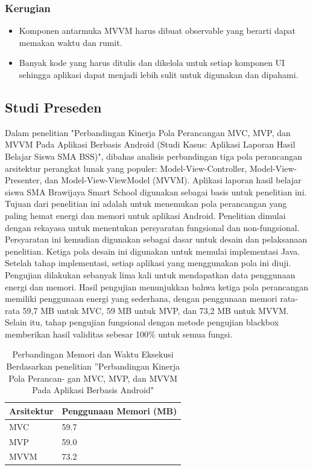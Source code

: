 \documentclass[conference]{IEEEtran}
\begin{document}
	\subsubsection{Kerugian}
	\begin{itemize}
		\item Komponen antarmuka MVVM harus dibuat observable yang berarti dapat memakan waktu dan rumit.
		\item Banyak kode yang harus ditulis dan dikelola untuk setiap komponen UI sehingga aplikasi dapat menjadi lebih sulit untuk digunakan dan dipahami.
	\end{itemize}
	
	\subsection{Studi Preseden}
	Dalam penelitian "Perbandingan Kinerja Pola Perancangan MVC, MVP, dan MVVM Pada Aplikasi Berbasis Android (Studi Kasus: Aplikasi Laporan Hasil Belajar Siswa SMA BSS)"\cite{Perbandingan1}, dibahas analisis perbandingan tiga pola perancangan arsitektur perangkat lunak yang populer: Model-View-Controller, Model-View-Presenter, dan Model-View-ViewModel (MVVM). Aplikasi laporan hasil belajar siswa SMA Brawijaya Smart School digunakan sebagai basis untuk penelitian ini. Tujuan dari penelitian ini adalah untuk menemukan pola perancangan yang paling hemat energi dan memori untuk aplikasi Android. Penelitian dimulai dengan rekayasa untuk menentukan persyaratan fungsional dan non-fungsional. Persyaratan ini kemudian digunakan sebagai dasar untuk desain dan pelaksanaan penelitian. Ketiga pola desain ini digunakan untuk memulai implementasi Java. Setelah tahap implementasi, setiap aplikasi yang menggunakan pola ini diuji. Pengujian dilakukan sebanyak lima kali untuk mendapatkan data penggunaan energi dan memori. Hasil pengujian menunjukkan bahwa ketiga pola perancangan memiliki penggunaan energi yang sederhana, dengan penggunaan memori rata-rata 59,7 MB untuk MVC, 59 MB untuk MVP, dan 73,2 MB untuk MVVM. Selain itu, tahap pengujian fungsional dengan metode pengujian blackbox memberikan hasil validitas sebesar 100\% untuk semua fungsi.
	
	\begin{table}[ht]
		\centering
		\caption{Perbandingan Memori dan Waktu Eksekusi Berdasarkan penelitian ”Perbandingan Kinerja Pola Perancan-
			gan MVC, MVP, dan MVVM Pada Aplikasi Berbasis Android"}
		\label{tab:comparison}
		\begin{tabular}{|l|l|}
			\hline
			\textbf{Arsitektur} & \textbf{Penggunaan Memori (MB)} \\ \hline
			MVC & 59.7 \\ \hline
			MVP & 59.0 \\ \hline
			MVVM & 73.2 \\ \hline
		\end{tabular}
	\end{table}
	
\end{document}
